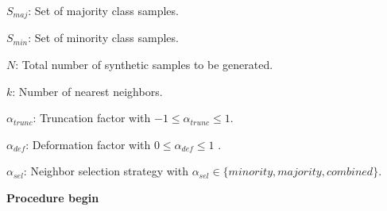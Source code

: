 \documentclass[parskip=full]{scrartcl}
\begin{document}
\begin{algorithm}
	
	\item \( S_{maj} \): Set of majority class samples.
	
	\item \( S_{min} \): Set of minority class samples.
	
	\item \( N \): Total number of synthetic samples to be generated.
	
	\item \( k \): Number of nearest neighbors.
	
	\item \( \alpha_{trunc} \): Truncation factor with \( -1 \leq \alpha_{trunc} \leq 1 \).
	
	\item \( \alpha_{def} \): Deformation factor with \( 0 \leq \alpha_{def} \leq 1 \) .
	
	\item \( \alpha_{sel} \): Neighbor selection strategy with \( \alpha_{sel} \in \Big\{ minority, majority, combined \Big\} \).
	
\end{algorithm}

\textbf{Procedure begin}
\end{document}
